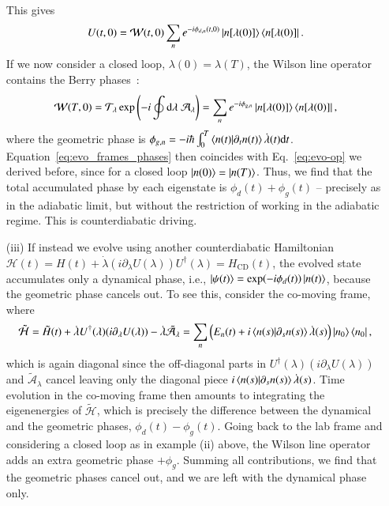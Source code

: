\begin{enumerate}
    This gives
    \begin{equation}
    \label{eq:evo_frames_phases}
        U(t,0) = \mathcal{W}(t,0)\sum_n e^{-i  \phi_{d,n}(t,0)} \ket{n[\lambda(0)]}\bra{n[\lambda(0)]}.
    \end{equation}
    If we now consider a closed loop, $\lambda(0)=\lambda(T)$, the Wilson line operator contains the Berry phases~\cite{Kato1950,bradlyn2022lecture}:
    \begin{equation}
        \mathcal{W}(T,0) = \mathcal{T}_\lambda \exp\left(-i \oint \mathrm d\lambda \;\mathcal{A}_{\lambda} \right) = \sum_n e^{-i  \phi_{g,n}} \ket{n[\lambda(0)]}\bra{n[\lambda(0)]},
    \end{equation}
    where the geometric phase is $\phi_{g,n}=-i\hbar\int^T_0 \bra{n(t)}\ket{\partial_t n(t)}\dot\lambda(t)\mathrm d t$. Equation~\eqref{eq:evo_frames_phases} then coincides with Eq.~\eqref{eq:evo-op} we derived before, since for a closed loop $\ket{n(0)} = \ket{n(T)}$. 
    Thus, we find that the total accumulated phase by each eigenstate is $\phi_d(t)+\phi_g(t)$ -- precisely as in the adiabatic limit, but without the restriction of working in the adiabatic regime. This is counterdiabatic driving. 
    
    \item[(iii)] If instead we evolve using another counterdiabatic Hamiltonian $\mathcal{H}(t)=H(t)+\dot\lambda (i\partial_\lambda U(\lambda))U^\dagger(\lambda)=H_\text{CD}(t)$, the evolved state accumulates only a dynamical phase, i.e., $\ket{\psi(t)}=\exp(-i\phi_d(t))\ket{n(t)}$, because the geometric phase cancels out. To see this, consider the co-moving frame, where 
    \begin{equation}
        \tilde{\mathcal H}= \tilde H(t) +  \dot\lambda U^\dagger(\lambda)(i\partial_\lambda U(\lambda)) - 
    \dot\lambda \tilde{\mathcal{A}}_\lambda =\sum_n \left(E_n(t)+i\bra{n(s)}\ket{\partial_s n(s)}\dot\lambda(s) \right) \ket{n_0}\bra{n_0},
    \end{equation}
    which is again diagonal since the off-diagonal parts in $U^\dagger(\lambda)(i\partial_\lambda U(\lambda))$ and $\tilde{\mathcal{A}}_\lambda$ cancel leaving only the diagonal piece $i\bra{n(s)}\ket{\partial_s n(s)}\dot\lambda(s)$. 
    Time evolution in the co-moving frame then amounts to integrating the eigenenergies of $\tilde{\mathcal H}$, which is precisely the difference between the dynamical and the geometric phases, $\phi_d(t)-\phi_{g}(t)$.
    Going back to the lab frame and considering a closed loop as in example (ii) above, the Wilson line operator adds an extra geometric phase $+\phi_{g}$. Summing all contributions, we find that the geometric phases cancel out, and we are left with the dynamical phase only. 


\end{enumerate}
